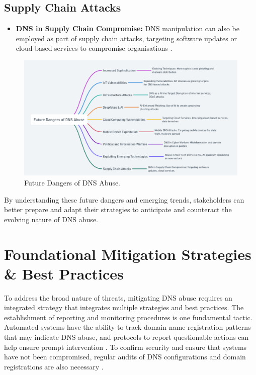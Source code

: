 \subsection{Supply Chain Attacks}
\begin{itemize}
    \item \textbf{DNS in Supply Chain Compromise:} DNS manipulation can also be employed as part of supply chain attacks, targeting software updates or cloud-based services to compromise organisations \cite{boyson2014cyber}.
\end{itemize}



\captionsetup{font= footnotesize} 
\begin{figure}  [H]
    \centering
    \includegraphics[width=\textwidth]{background/Future Dangers of DNS Abuse.png}
    \caption{Future Dangers of DNS Abuse.}
    \label{fig:LOLOLOL}
\end{figure}

By understanding these future dangers and emerging trends, stakeholders can better prepare and adapt their strategies to anticipate and counteract the evolving nature of DNS abuse.


\section{Foundational Mitigation Strategies \& Best Practices }

To address the broad nature of threats, mitigating DNS abuse requires an integrated strategy that integrates multiple strategies and best practices. The establishment of reporting and monitoring procedures is one fundamental tactic. Automated systems have the ability to track domain name registration patterns that may indicate DNS abuse, and protocols to report questionable actions can help ensure prompt intervention \cite{icannndnssec}. To confirm security and ensure that systems have not been compromised, regular audits of DNS configurations and domain registrations are also necessary \cite{lucas2021tls} .

